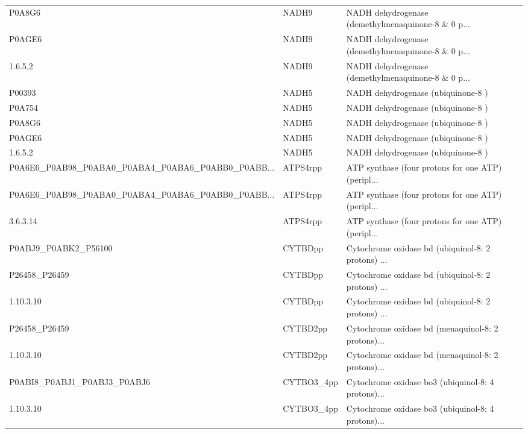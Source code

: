 \begin{tabular}{lll}
                                            P0A8G6 &      NADH9 & NADH dehydrogenase (demethylmenaquinone-8 \& 0 p... \\
                                            P0AGE6 &      NADH9 & NADH dehydrogenase (demethylmenaquinone-8 \& 0 p... \\
                                           1.6.5.2 &      NADH9 & NADH dehydrogenase (demethylmenaquinone-8 \& 0 p... \\
                                            P00393 &      NADH5 &                 NADH dehydrogenase (ubiquinone-8 ) \\
                                            P0A754 &      NADH5 &                 NADH dehydrogenase (ubiquinone-8 ) \\
                                            P0A8G6 &      NADH5 &                 NADH dehydrogenase (ubiquinone-8 ) \\
                                            P0AGE6 &      NADH5 &                 NADH dehydrogenase (ubiquinone-8 ) \\
                                           1.6.5.2 &      NADH5 &                 NADH dehydrogenase (ubiquinone-8 ) \\
P0A6E6\_P0AB98\_P0ABA0\_P0ABA4\_P0ABA6\_P0ABB0\_P0ABB... &   ATPS4rpp & ATP synthase (four protons for one ATP) (peripl... \\
P0A6E6\_P0AB98\_P0ABA0\_P0ABA4\_P0ABA6\_P0ABB0\_P0ABB... &   ATPS4rpp & ATP synthase (four protons for one ATP) (peripl... \\
                                          3.6.3.14 &   ATPS4rpp & ATP synthase (four protons for one ATP) (peripl... \\
                              P0ABJ9\_P0ABK2\_P56100 &    CYTBDpp & Cytochrome oxidase bd (ubiquinol-8: 2 protons) ... \\
                                     P26458\_P26459 &    CYTBDpp & Cytochrome oxidase bd (ubiquinol-8: 2 protons) ... \\
                                         1.10.3.10 &    CYTBDpp & Cytochrome oxidase bd (ubiquinol-8: 2 protons) ... \\
                                     P26458\_P26459 &   CYTBD2pp & Cytochrome oxidase bd (menaquinol-8: 2 protons)... \\
                                         1.10.3.10 &   CYTBD2pp & Cytochrome oxidase bd (menaquinol-8: 2 protons)... \\
                       P0ABI8\_P0ABJ1\_P0ABJ3\_P0ABJ6 & CYTBO3\_4pp & Cytochrome oxidase bo3 (ubiquinol-8: 4 protons)... \\
                                         1.10.3.10 & CYTBO3\_4pp & Cytochrome oxidase bo3 (ubiquinol-8: 4 protons)... \\
\bottomrule
\end{tabular}
